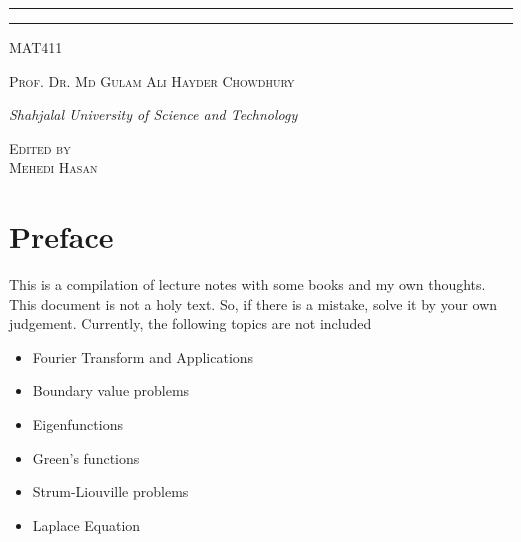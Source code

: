\documentclass[12pt,oneside]{book}
\newcommand{\course}{MAT411}
\newcommand{\prof}{Prof. Dr. Md Gulam Ali Hayder Chowdhury}
\begin{document}
\begin{titlepage}
\rule{345pt}{0.4pt}\vspace*{-\baselineskip}\vspace{3.2pt}
\rule{345pt}{1.6pt}

\vspace{2\baselineskip}

{\scshape \Large{\course}} 

\vspace*{5\baselineskip}



\vspace{0.5\baselineskip} 

{\scshape   \Large \prof\\ }

\vspace{0.75\baselineskip} 

{\textit{\large Shahjalal University of Science and Technology}} 

\vfill 

\vspace{0.3\baselineskip} 


{\scshape \large Edited by\\  Mehedi Hasan} 
\vspace*{40pt}
\end{titlepage}
\newpage
\section*{Preface}
This is a compilation of lecture notes with some books and my own thoughts. This document is not a holy text. So, if there is a mistake, solve it by your own judgement. Currently, the following topics are not included
\begin{itemize}
    \item Fourier Transform and Applications
    \item Boundary value problems
    \item Eigenfunctions
    \item Green's functions
    \item Strum-Liouville problems
    \item Laplace Equation
\end{itemize}

\newpage
\tableofcontents
\newpage
{}
\end{document}
